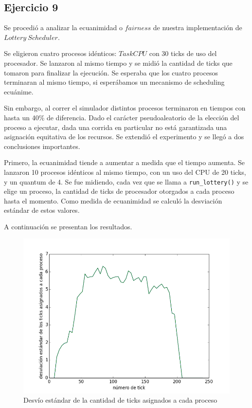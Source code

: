 \documentclass[11pt, a4paper, twoside]{article}
\begin{document}
\clearpage
\subsection{Ejercicio 9}

Se procedió a analizar la ecuanimidad o $fairness$ de nuestra implementación de $Lottery\ Scheduler$.

Se eligieron cuatro procesos idénticos: $TaskCPU$ con 30 ticks de uso del procesador. Se lanzaron al mismo tiempo y se midió la cantidad de ticks que tomaron para finalizar la ejecución. Se esperaba que los cuatro procesos terminaran al mismo tiempo, si esperábamos un mecanismo de scheduling ecuánime.

Sin embargo, al correr el simulador distintos procesos terminaron en tiempos con hasta un 40\% de diferencia. Dado el carácter pseudoaleatorio de la elección del proceso a ejecutar, dada una corrida en particular no está garantizada una asignación equitativa de los recursos. Se extendió el experimento y se llegó a dos conclusiones importantes.

Primero, la ecuanimidad tiende a aumentar a medida que el tiempo aumenta. Se lanzaron 10 procesos idénticos al mismo tiempo, con un uso del CPU de 20 ticks, y un quantum de 4. Se fue midiendo, cada vez que se llama a \texttt{run\_lottery()} y se elige un proceso, la cantidad de ticks de procesador otorgados a cada proceso hasta el momento. Como medida de ecuanimidad se calculó la desviación estándar de estos valores.

A continuación se presentan los resultados.

\begin{figure}[H]
\centering
\includegraphics[width=\textwidth]{../experimentacion/ej9-fairness/fairness/plot.png}
\caption{Desvío estándar de la cantidad de ticks asignados a cada proceso}
\end{figure}
\end{document}
